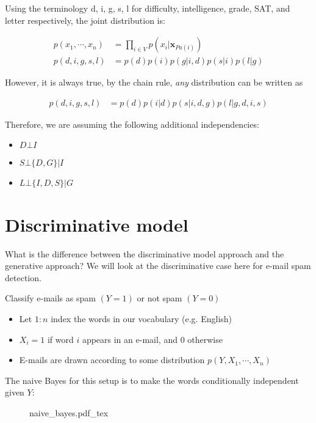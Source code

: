 \documentclass{article}
\begin{document}
Using the terminology d, i, g, s, l for difficulty, intelligence, grade, SAT, and letter respectively, the joint distribution is:

\begin{align}
    p(x_{1}, \cdots , x_{n}) &= \prod_{i \in V} p(x_{i} | \boldsymbol{x}_{Pa(i)}) \\
    p(d,i,g,s,l) &= p(d)p(i)p(g | i,d)p(s | i)p(l | g)
\end{align}

However, it is always true, by the chain rule, \textit{any} distribution can be written as

\begin{align}
    p(d, i, g, s, l) &= p (d)p(i | d)p(s | i, d, g)p(l | g,d,i, s)
\end{align}

Therefore, we are assuming the following additional independencies:

\begin{itemize}
    \item $ D \bot I $
    \item $ S \bot \{D, G\} | I $
    \item $ L \bot \{ I, D, S \} | G $
\end{itemize}

\section{Discriminative model}

What is the difference between the discriminative model approach and the generative approach?  We will look at the discriminative case here for e-mail spam detection.

Classify e-mails as spam $(Y = 1)$ or not spam $(Y = 0)$
\begin{itemize}
    \item Let $ 1 : n $ index the words in our vocabulary (e.g. English)
    \item $ X_{i} = 1 $ if word $i$ appears in an e-mail, and $0$ otherwise
    \item E-mails are drawn according to some distribution $ p(Y, X_{1}, \cdots , X_{n})$
\end{itemize}

The naive Bayes for this setup is to make the words conditionally independent given $Y$:

\begin{figure}[hbt!]
    \centering
    \begin{normalsize}
        {naive_bayes.pdf_tex}
    \end{normalsize}
    \label{fig:Naive Bayes for Spam detection}
\end{figure}
\end{document}
